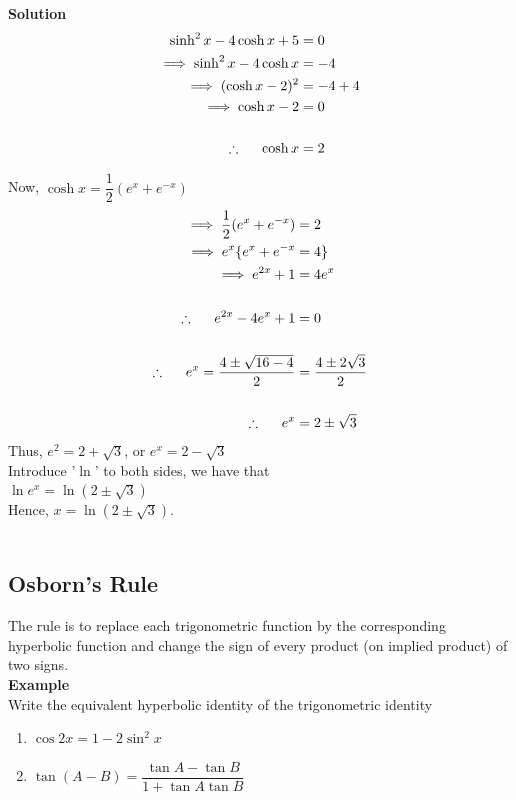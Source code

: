 \documentclass[11pt,a4paper]{article}
\begin{document}
\textbf{Solution}
\begin{align*}
\sinh^2x -4\cosh x +5 & = 0\\
\implies \sinh^2x-4\cosh x & = -4\\
\implies (\cosh x-2)^2 & =-4+4\\
\implies \cosh x -2 & = 0\\\\
\therefore \hspace{0.5cm} \cosh x & =2
\end{align*}

Now, $\cosh x =\dfrac{1}{2}(e^x+e^{-x})$\\

\begin{align*}
\displaystyle
\implies \frac{1}{2}(e^x+e^{-x}) & =2\\
\implies e^x\{e^x+e^{-x} & = 4\}\\
\implies e^{2x}+1 & =4e^x\\\\
\therefore \hspace{0.5cm}e^{2x}-4e^x+1 &=0\\\\
\therefore \hspace{0.5cm} e^x=\frac{4\pm \sqrt{16-4}}{2}& =\frac{4\pm 2\sqrt{3}}{2}\\\\
\therefore\hspace{0.5cm} e^x &=2\pm \sqrt{3}
\end{align*}
Thus, $e^2=2+\sqrt{3}$, or $e^x=2-\sqrt{3}$\\

Introduce '$\ln$' to both sides, we have that\\

$\ln e^x=\ln (2\pm \sqrt{3})$\\

Hence, $x=\ln (2\pm \sqrt{3})$.\\\\



\subsection{Osborn's Rule}
The rule is to replace each trigonometric function by the corresponding hyperbolic function and change the sign of every product (on implied product) of two signs.\\

\textbf{Example}\\
Write the equivalent hyperbolic identity of the trigonometric identity
\begin{enumerate}
\item $\cos 2x=1-2\sin^2x$

\item $\tan (A-B)=\dfrac{\tan A-\tan B}{1+\tan A\tan B}$\\
\end{enumerate}
\end{document}
